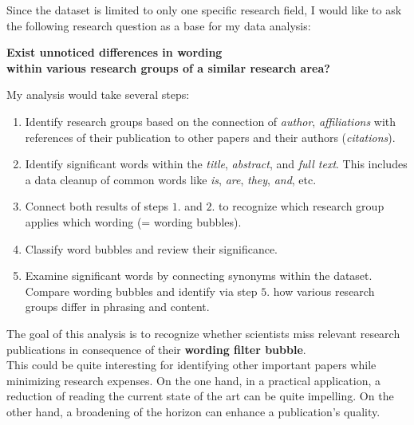 \begin{homeworkProblem}
  Since the dataset is limited to only one specific research field, I would like to ask the following research question as a base for my data analysis:\\

\begin{center}\textbf{Exist unnoticed differences in wording\\ within various research groups of a similar research area?}\\
\end{center}


  My analysis would take several steps:
  \begin{enumerate}
    \item Identify research groups based on the connection of \emph{author}, \emph{affiliations} with references of their publication to other papers and their authors (\emph{citations}).
    \item Identify significant words within the \emph{title}, \emph{abstract}, and \emph{full text}. This includes a data cleanup of common words like \textit{is}, \textit{are}, \textit{they}, \textit{and}, etc.
    \item Connect both results of steps $1.$ and $2.$ to recognize which research group applies which wording (= wording bubbles).
    \item Classify word bubbles and review their significance.
    \item Examine significant words by connecting synonyms within the dataset.
    Compare wording bubbles and identify via step $5.$ how various research groups differ in phrasing and content.
  \end{enumerate}


  The goal of this analysis is to recognize whether scientists miss relevant research publications in consequence of their \textbf{wording filter bubble}.\\

  This could be quite interesting for identifying other important papers while minimizing research expenses. On the one hand, in a practical application, a reduction of reading the current state of the art can be quite impelling. On the other hand, a broadening of the horizon can enhance a publication's quality.
\end{homeworkProblem}


